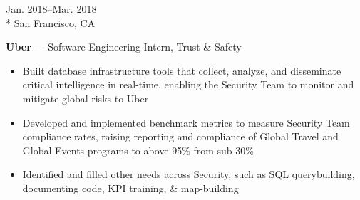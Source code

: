 \documentclass[a4paper,9pt]{article}
\begin{document}
\vspace{-3ex}
\begin{minipage}[t]{0.20\linewidth}
	\begin{small}
		\begin{spacing}{1.00}
			\begin{flushright}
				Jan. 2018--Mar. 2018
				\\*
				\vspace*{2.5pt}
				San Francisco, CA
			\end{flushright}
		\end{spacing}
	\end{small}
\end{minipage}
\hspace{4mm}
\begin{minipage}[t]{0.75\linewidth}
	\begin{small}
		\begin{spacing}{1.00}
			\begin{flushleft}
				\textbf{Uber} --- Software Engineering Intern, Trust \& Safety
				\begin{itemize}[itemsep=0pt,topsep=2.5pt,leftmargin=*]
					\item Built database infrastructure tools that collect, analyze, and disseminate critical intelligence in real-time, enabling the Security Team to monitor and mitigate global risks to Uber
					\item Developed and implemented benchmark metrics to measure Security Team compliance rates, raising reporting and compliance of Global Travel and Global Events programs to above 95\% from sub-30\%
					\item Identified and filled other needs across Security, such as SQL querybuilding, documenting code, KPI training, \& map-building
				\end{itemize}
			\end{flushleft}
		\end{spacing}
	\end{small}
\end{minipage}
\end{document}
